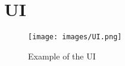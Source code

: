 \chapter{UI}
\begin{figure}
    \centering
    \texttt{[image: images/UI.png]}
    \caption{Example of the UI}
    \label{fig:ui}
\end{figure}
